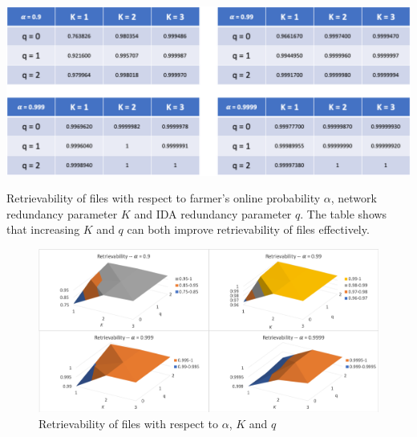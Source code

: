 \begin{table}[hbt]
  \centering
    \includegraphics[width=14cm]{tables/table_retrievability.png}
    \caption[Retrievability of files with respect to farmer's online probability $\alpha$, network redundancy parameter $K$ and IDA redundancy parameter $q$]{Retrievability of files with respect to farmer's online probability $\alpha$, network redundancy parameter $K$ and IDA redundancy parameter $q$. The table shows that increasing $K$ and $q$ can both improve retrievability of files effectively.}
    \label{table:retrievability}
\end{table}
  
\begin{figure}[hbt]
  \centering
    \includegraphics[width=14cm]{charts/chart_retrievability.png}
    \caption{Retrievability of files with respect to $\alpha$, $K$ and $q$}
    \label{fig:retrievability}
\end{figure}

